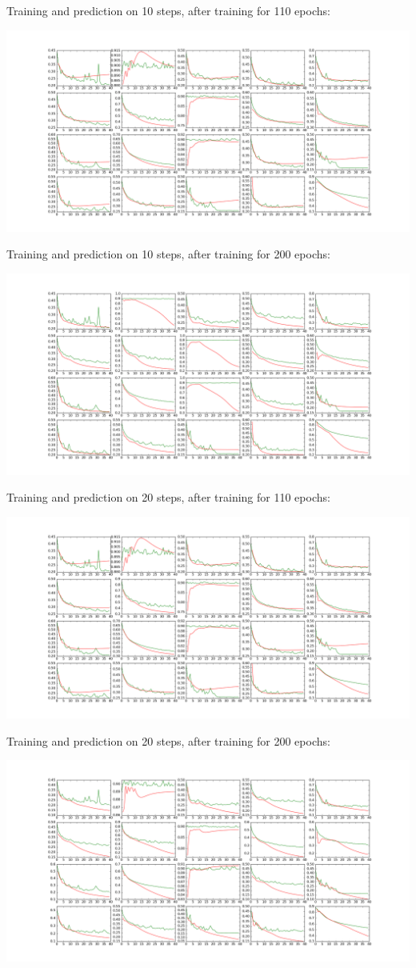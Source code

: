 \documentclass[a4paper,10pt]{article}
\begin{document}
Training and prediction on 10 steps, after training for 110 epochs:

\includegraphics[width=\textwidth]{../../figures/LSTM_m2m_10_steps_epoch_109}

Training and prediction on 10 steps, after training for 200 epochs:

\includegraphics[width=\textwidth]{../../figures/LSTM_m2m_10_steps_epoch_199}

Training and prediction on 20 steps, after training for 110 epochs:

\includegraphics[width=\textwidth]{../../figures/LSTM_m2m_10_steps_epoch_109}

Training and prediction on 20 steps, after training for 200 epochs:

\includegraphics[width=\textwidth]{../../figures/LSTM_m2m_20_steps_epoch_199}
\end{document}
